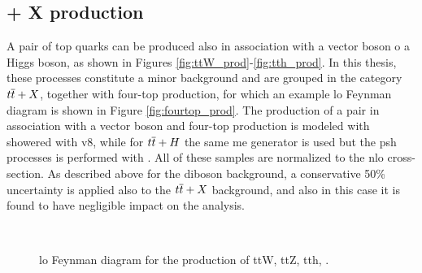 \subsection{\ttbar + X production}

A pair of top quarks can be produced also in association with a vector boson o a Higgs boson, as shown in Figures \ref{fig:ttW_prod}-\ref{fig:tth_prod}.
In this thesis, these processes constitute a minor background and are grouped in the category $t\overline{t}+X$, together with four-top production,
for which an example \gls{lo} Feynman diagram is shown in Figure \ref{fig:fourtop_prod}. 
The production of a \ttbar pair in association with a vector boson and four-top production is modeled with \aNLO showered with \PY v8, while for $t\overline{t}+H$ the same 
\gls{me} generator is used but the \gls{psh} processes is performed with \HWpp. 
All of these samples are normalized to the \gls{nlo} cross-section.
As described above for the diboson background, a conservative 50\% uncertainty is applied also to the 
$t\overline{t}+X$ background, and also in this case it is found to have negligible impact on the analysis. 

\begin{figure}[h]
\centering 
{}
 \\
\caption{\Gls{lo} Feynman diagram for the production of  ttW,  ttZ,  tth,  \fourtop.}\label{fig:ttX_prod}
\end{figure}


